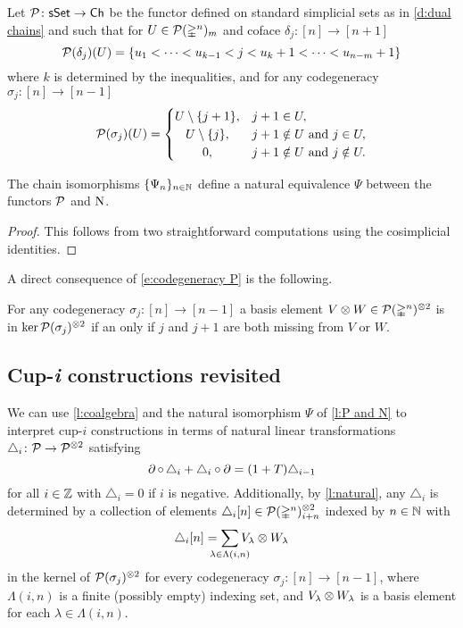 \begin{definition}
	Let $\mathcal{P} \colon \mathsf{sSet} \to \mathsf{Ch}$ be the functor defined on standard simplicial sets as in \cref{d:dual chains} and such that for $U \in \mathcal{P}(\mathbb{\Delta}^n)_m$ and coface $\delta_j \colon [n] \to [n+1]$
	\[
	\mathcal{P}(\delta_j)(U) = \{ u_1 < \dots < u_{k-1} < j < u_k+1 < \dots < u_{n-m}+1 \}
	\]
	where $k$ is determined by the inequalities, and for any codegeneracy $\sigma_j \colon [n] \to [n-1]$
	\begin{equation}\label{e:codegeneracy P}
	\cP(\sigma_j)(U) = \begin{cases}
	U \setminus \{j+1\}, & j+1 \in U, \\
	\hfil U \setminus \{j\}, & j+1 \notin U \text{ and } j \in U, \\
	\hfil 0, & j+1 \notin U \text{ and } j \notin U.
	\end{cases}
	\end{equation}
\end{definition}

\begin{lemma}\label{l:P and N}
	The chain isomorphisms $\{\Psi_n\}_{n \in \mathbb{N}}$ define a natural equivalence $\Psi$ between the functors $\mathcal{P}$ and $\operatorname{N}$.
\end{lemma}

\begin{proof}
	This follows from two straightforward computations using the cosimplicial identities.
\end{proof}

A direct consequence of \cref{e:codegeneracy P} is the following.

\begin{lemma}\label{l:kernel of sxs}
	For any codegeneracy $\sigma_j \colon [n] \to [n-1]$ a basis element $V \otimes W \in \mathcal{P}(\mathbb{\Delta}^n)^{\otimes 2}$ is in $\ker \mathcal{P}(\sigma_j)^{\otimes 2}$ if an only if $j$ and $j+1$ are both missing from $V$ or $W$.
\end{lemma}

\subsection{Cup-\textit{i} constructions revisited}

We can use \cref{l:coalgebra} and the natural isomorphism $\Psi$ of \cref{l:P and N} to interpret \mbox{cup-$i$} constructions in terms of natural linear transformations $\triangle_i \colon \mathcal{P} \to \mathcal{P}^{\otimes 2}$ satisfying
\[
\operatorname{\partial} \circ \, \triangle_i + \triangle_i \circ \operatorname{\partial} =
(1+T) \triangle_{i-1}
\]
for all $i \in \mathbb{Z}$ with $\triangle_{i} = 0$ if $i$ is negative.
Additionally, by \cref{l:natural}, any $\triangle_i$ is determined by a collection of elements $\triangle_i [n] \in \mathcal{P}(\mathbb{\Delta}^n)^{\otimes 2}_{i+n} $ indexed by $n \in \mathbb{N}$ with
\[
\triangle_i [n] =
\sum_{\mathclap{\lambda \in \Lambda(i,n)}} V_\lambda \ot W_\lambda
\]
in the kernel of $\mathcal{P}(\sigma_j)^{\otimes 2}$ for every codegeneracy $\sigma_j \colon [n] \to [n-1]$,
where $\Lambda(i,n)$ is a finite (possibly empty) indexing set, and $V_\lambda \otimes W_\lambda$ is a basis element for each $\lambda \in \Lambda(i,n)$.

